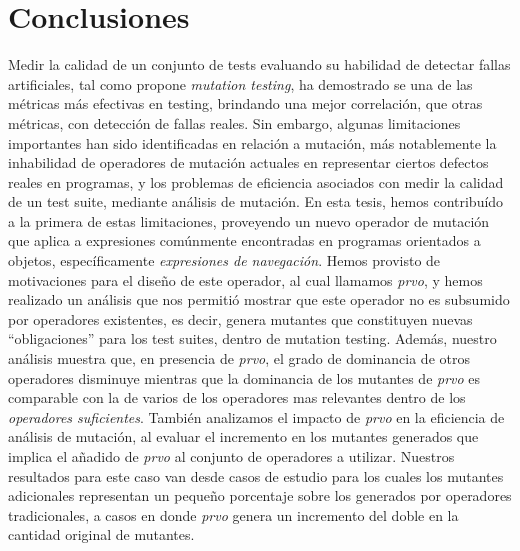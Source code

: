 \chapter[Conclusiones]{Conclusiones}
\label{sec:conclutions}

Medir la calidad de un conjunto de tests evaluando su habilidad de detectar fallas artificiales, tal como propone \emph{mutation testing}, ha demostrado se una de las m\'etricas m\'as efectivas en testing, brindando una mejor correlaci\'on, que otras m\'etricas, con detecci\'on de fallas reales. Sin embargo, algunas limitaciones importantes han sido identificadas en relaci\'on a mutaci\'on, m\'as notablemente la inhabilidad de operadores de mutaci\'on actuales en representar ciertos defectos reales en programas, y los problemas de eficiencia asociados con medir la calidad de un test suite, mediante an\'alisis de mutaci\'on. En esta tesis, hemos contribu\'ido a la primera de estas limitaciones, proveyendo un nuevo operador de mutaci\'on que aplica a expresiones com\'unmente encontradas en programas orientados a objetos, espec\'ificamente \emph{expresiones de navegaci\'on}. Hemos provisto de motivaciones para el dise\~no de este operador, al cual llamamos \emph{prvo}, y hemos realizado un an\'alisis que nos permiti\'o mostrar que este operador no es subsumido por operadores existentes, es decir, genera mutantes que constituyen nuevas ``obligaciones'' para los test suites, dentro de mutation testing. Adem\'as, nuestro an\'alisis muestra que, en presencia de \emph{prvo}, el grado de dominancia de otros operadores disminuye mientras que la dominancia de los mutantes de \emph{prvo} es comparable con la de varios de los operadores mas relevantes dentro de los \emph{operadores suficientes}. Tambi\'en analizamos el impacto de \emph{prvo} en la eficiencia de an\'alisis de mutaci\'on, al evaluar el incremento en los mutantes generados que implica el a\~nadido de \emph{prvo} al conjunto de operadores a utilizar. Nuestros resultados para este caso van desde casos de estudio para los cuales los mutantes adicionales representan un peque\~no porcentaje sobre los generados por operadores tradicionales, a casos en donde \emph{prvo} genera un incremento del doble en la cantidad original de mutantes.